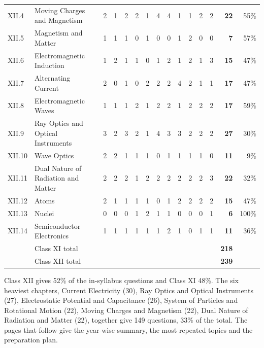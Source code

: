 {\begin{tabularx}{\linewidth}{@{}l>{\raggedright\arraybackslash}X*{11}{c}rr@{}}
XII.4 & Moving Charges and Magnetism & 2 & 1 & 2 & 2 & 1 & 4 & 4 & 1 & 1 & 2 & 2 & \textbf{22} & 55\%\\
XII.5 & Magnetism and Matter & 1 & 1 & 1 & 0 & 1 & 0 & 0 & 1 & 2 & 0 & 0 & \textbf{7} & 57\%\\
XII.6 & Electromagnetic Induction & 1 & 2 & 1 & 1 & 0 & 1 & 2 & 1 & 2 & 1 & 3 & \textbf{15} & 47\%\\
XII.7 & Alternating Current & 2 & 0 & 1 & 0 & 2 & 2 & 2 & 4 & 2 & 1 & 1 & \textbf{17} & 47\%\\
XII.8 & Electromagnetic Waves & 1 & 1 & 1 & 2 & 1 & 2 & 2 & 1 & 2 & 2 & 2 & \textbf{17} & 59\%\\
XII.9 & Ray Optics and Optical Instruments & 3 & 2 & 3 & 2 & 1 & 4 & 3 & 3 & 2 & 2 & 2 & \textbf{27} & 30\%\\
XII.10 & Wave Optics & 2 & 2 & 1 & 1 & 1 & 0 & 1 & 1 & 1 & 1 & 0 & \textbf{11} & 9\%\\
XII.11 & Dual Nature of Radiation and Matter & 2 & 2 & 2 & 1 & 2 & 2 & 2 & 2 & 2 & 2 & 3 & \textbf{22} & 32\%\\
XII.12 & Atoms & 2 & 1 & 1 & 1 & 1 & 0 & 1 & 2 & 2 & 2 & 2 & \textbf{15} & 47\%\\
XII.13 & Nuclei & 0 & 0 & 0 & 1 & 2 & 1 & 1 & 0 & 0 & 0 & 1 & \textbf{6} & 100\%\\
XII.14 & Semiconductor Electronics & 1 & 1 & 1 & 1 & 1 & 1 & 2 & 1 & 0 & 1 & 1 & \textbf{11} & 36\%\\
\midrule & Class XI total & \multicolumn{11}{c}{} & \textbf{218} & \\
& Class XII total & \multicolumn{11}{c}{} & \textbf{239} & \\\bottomrule
\end{tabularx}}\par\medskip
{\small Class XII gives 52\% of the in-syllabus questions and Class XI 48\%. The six heaviest chapters, Current Electricity (30), Ray Optics and Optical Instruments (27), Electrostatic Potential and Capacitance (26), System of Particles and Rotational Motion (22), Moving Charges and Magnetism (22), Dual Nature of Radiation and Matter (22), together give 149 questions, 33\% of the total. The pages that follow give the year-wise summary, the most repeated topics and the preparation plan.}\par

